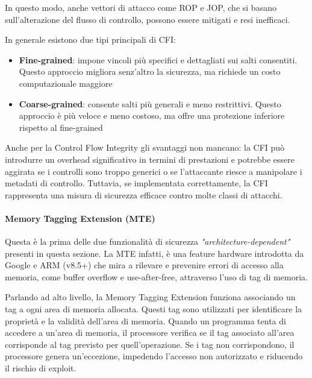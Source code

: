 In questo modo, anche vettori di attacco come ROP e JOP, che si basano sull'alterazione
del flusso di controllo, possono essere mitigati e resi inefficaci.

In generale esistono due tipi principali di CFI:
\begin{itemize}
  \item \textbf{Fine-grained}: impone vincoli più specifici e dettagliati sui salti
    consentiti. Questo approccio migliora senz'altro la sicurezza, ma richiede un
    costo computazionale maggiore

  \item \textbf{Coarse-grained}: consente salti più generali e meno restrittivi.
    Questo approccio è più veloce e meno costoso, ma offre una protezione inferiore
    rispetto al fine-grained
\end{itemize}

Anche per la Control Flow Integrity gli svantaggi non mancano: la CFI può introdurre
un overhead significativo in termini di prestazioni e potrebbe essere aggirata se
i controlli sono troppo generici o se l'attaccante riesce a manipolare i metadati
di controllo. Tuttavia, se implementata correttamente, la CFI rappresenta una
misura di sicurezza efficace contro molte classi di attacchi.

\paragraph{Memory Tagging Extension (MTE)}
Questa è la prima delle due funzionalità di sicurezza \textit{"architecture-dependent"}
presenti in questa sezione. La MTE infatti, è una feature hardware introdotta da
Google e ARM (v8.5+) che mira a rilevare e prevenire errori di accesso alla
memoria, come buffer overflow e use-after-free, attraverso l'uso di tag di
memoria.

Parlando ad alto livello, la Memory Tagging Extension funziona associando un tag
a ogni area di memoria allocata. Questi tag sono utilizzati per identificare la
proprietà e la validità dell'area di memoria. Quando un programma tenta di accedere
a un'area di memoria, il processore verifica se il tag associato all'area
corrisponde al tag previsto per quell'operazione. Se i tag non corrispondono, il
processore genera un'eccezione, impedendo l'accesso non autorizzato e riducendo il
rischio di exploit.

